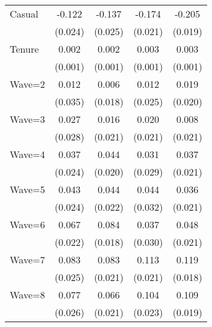 {\begin{tabular}{l*{4}{c}}
Casual              &      -0.122\sym{***}&      -0.137\sym{***}&      -0.174\sym{***}&      -0.205\sym{***}\\
                    &     (0.024)         &     (0.025)         &     (0.021)         &     (0.019)         \\
Tenure              &       0.002\sym{**} &       0.002\sym{**} &       0.003\sym{***}&       0.003\sym{***}\\
                    &     (0.001)         &     (0.001)         &     (0.001)         &     (0.001)         \\
Wave=2              &       0.012         &       0.006         &       0.012         &       0.019         \\
                    &     (0.035)         &     (0.018)         &     (0.025)         &     (0.020)         \\
Wave=3              &       0.027         &       0.016         &       0.020         &       0.008         \\
                    &     (0.028)         &     (0.021)         &     (0.021)         &     (0.021)         \\
Wave=4              &       0.037         &       0.044\sym{**} &       0.031         &       0.037\sym{*}  \\
                    &     (0.024)         &     (0.020)         &     (0.029)         &     (0.021)         \\
Wave=5              &       0.043\sym{*}  &       0.044\sym{**} &       0.044         &       0.036\sym{*}  \\
                    &     (0.024)         &     (0.022)         &     (0.032)         &     (0.021)         \\
Wave=6              &       0.067\sym{***}&       0.084\sym{***}&       0.037         &       0.048\sym{**} \\
                    &     (0.022)         &     (0.018)         &     (0.030)         &     (0.021)         \\
Wave=7              &       0.083\sym{***}&       0.083\sym{***}&       0.113\sym{***}&       0.119\sym{***}\\
                    &     (0.025)         &     (0.021)         &     (0.021)         &     (0.018)         \\
Wave=8              &       0.077\sym{***}&       0.066\sym{***}&       0.104\sym{***}&       0.109\sym{***}\\
                    &     (0.026)         &     (0.021)         &     (0.023)         &     (0.019)         \\

\end{tabular}}
